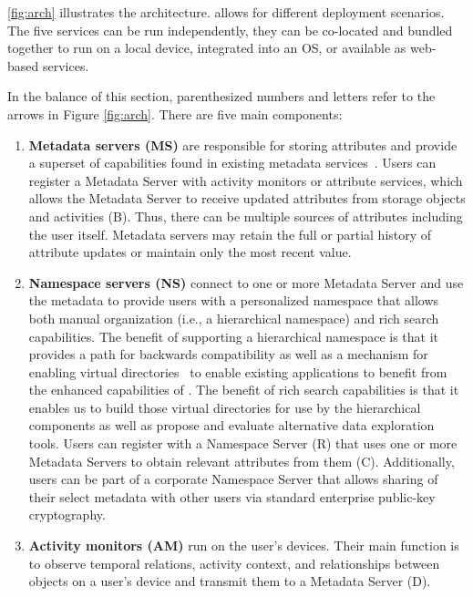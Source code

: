 \autoref{fig:arch} illustrates the \system architecture. \system allows for
different deployment scenarios. The five services can be run independently, they
can be co-located and bundled together to run on a local device, integrated into
an OS, or available as web-based services.

In the balance of this section, parenthesized numbers and letters refer to the arrows
in Figure \ref{fig:arch}. There are five main components:

\begin{enumerate}

    \item \textbf{Metadata servers (MS)} are responsible for storing attributes
          and provide a superset of capabilities found in existing metadata
          services~\cite{federatedMetaData,smartstore}. Users can register a
          Metadata Server with
          activity monitors or attribute services, which allows the Metadata Server to receive
          updated attributes from storage objects and activities (B). Thus, there can
          be multiple sources of attributes including the user itself. Metadata
          servers may retain the full or partial history of attribute updates or
          maintain only the most recent value.

    \item \textbf{Namespace servers (NS)} connect to one or more Metadata Server and use the metadata to provide users with a
          personalized namespace that allows both manual organization (i.e., a
          hierarchical namespace) and rich search capabilities.  The benefit of
          supporting a hierarchical namespace is that it provides a path for
          backwards compatibility as well as a mechanism for enabling virtual
          directories~\cite{gifford1991semantic} to enable existing applications
          to benefit from the enhanced capabilities of \system.  The benefit of
          rich search capabilities is that it enables us to build those virtual
          directories for use by the hierarchical components as well as propose
          and evaluate alternative data exploration tools.
          Users can register with a Namespace Server (R) that uses one or more Metadata Servers to obtain relevant
          attributes from them (C). Additionally, users can be part of a corporate Namespace Server that
          allows sharing of their select metadata with other users via standard enterprise
          public-key cryptography.

    \item \textbf{Activity monitors (AM)} run on the user's devices. Their main function is to observe temporal relations,
          activity context, and relationships between objects on a user's device and
          transmit them to a Metadata Server (D).


\end{enumerate}
